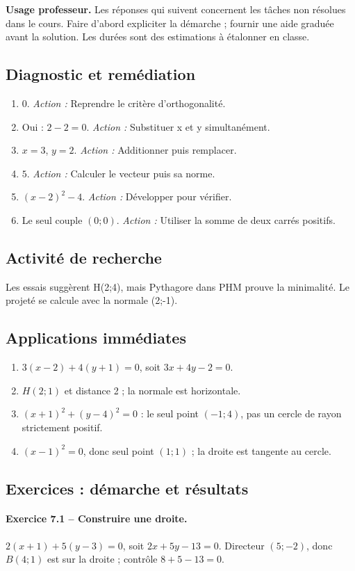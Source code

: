 \label{C07-CORR}
\textbf{Usage professeur.} Les réponses qui suivent concernent les tâches non résolues dans le cours. Faire d’abord expliciter la démarche ; fournir une aide graduée avant la solution. Les durées sont des estimations à étalonner en classe.
\subsection*{Diagnostic et remédiation}
\begin{enumerate}
\item $0$. \textit{Action :} Reprendre le critère d’orthogonalité.
\item Oui : $2-2=0$. \textit{Action :} Substituer x et y simultanément.
\item $x=3$, $y=2$. \textit{Action :} Additionner puis remplacer.
\item $5$. \textit{Action :} Calculer le vecteur puis sa norme.
\item $(x-2)^2-4$. \textit{Action :} Développer pour vérifier.
\item Le seul couple $(0;0)$. \textit{Action :} Utiliser la somme de deux carrés positifs.
\end{enumerate}
\subsection*{Activité de recherche}
Les essais suggèrent H(2;4), mais Pythagore dans PHM prouve la minimalité. Le projeté se calcule avec la normale (2;-1).
\subsection*{Applications immédiates}
\begin{enumerate}
\item $3(x-2)+4(y+1)=0$, soit $3x+4y-2=0$.
\item $H(2;1)$ et distance 2 ; la normale est horizontale.
\item $(x+1)^2+(y-4)^2=0$ : le seul point $(-1;4)$, pas un cercle de rayon strictement positif.
\item $(x-1)^2=0$, donc seul point $(1;1)$ ; la droite est tangente au cercle.
\end{enumerate}
\subsection*{Exercices : démarche et résultats}
\paragraph{Exercice 7.1 -- Construire une droite.} $2(x+1)+5(y-3)=0$, soit $2x+5y-13=0$. Directeur $(5;-2)$, donc $B(4;1)$ est sur la droite ; contrôle $8+5-13=0$.
